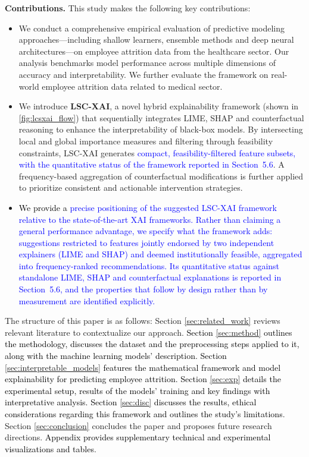 \documentclass[a4paper,fleqn]{cas-sc}
\begin{document}
\par\noindent\textbf{Contributions.} This study makes the following key contributions:
\begin{itemize}
    \item [(I)] We conduct a comprehensive empirical evaluation of predictive modeling approaches—including shallow learners, ensemble methods and deep neural architectures—on employee attrition data from the healthcare sector. Our analysis benchmarks model performance across multiple dimensions of accuracy and interpretability. We further evaluate the framework on real-world employee attrition data related to medical sector.
    
    \item[(II)] We introduce \textbf{LSC-XAI}, a novel hybrid explainability framework (shown in \cref{fig:lcsxai_flow}) that sequentially integrates LIME, SHAP and counterfactual reasoning to enhance the interpretability of black-box models. By intersecting local and global importance measures and filtering through feasibility constraints, LSC-XAI generates \textcolor{blue}{compact, feasibility-filtered feature subsets, with the quantitative status of the framework reported in Section~5.6}. A frequency-based aggregation of counterfactual modifications is further applied to prioritize consistent and actionable intervention strategies.

    \item[(III)] \textcolor{black}{We provide a} \textcolor{blue}{precise positioning of the suggested LSC-XAI framework relative to the state-of-the-art XAI frameworks. Rather than claiming a general performance advantage, we specify what the framework adds: suggestions restricted to features jointly endorsed by two independent explainers (LIME and SHAP) and deemed institutionally feasible, aggregated into frequency-ranked recommendations. Its quantitative status against standalone LIME, SHAP and counterfactual explanations is reported in Section~5.6, and the properties that follow by design rather than by measurement are identified explicitly.}  
\end{itemize}

The structure of this paper is as follows: Section \ref{sec:related_work} reviews relevant literature to contextualize our approach. \textcolor{black}{Section \ref{sec:method} outlines the methodology, discusses the dataset and the preprocessing steps applied to it, along with the machine learning models' description. Section \ref{sec:interpretable_models} features the mathematical framework and model explainability for predicting employee attrition. Section \ref{sec:exp} details the experimental setup, results of the models' training and key findings with interpretative analysis. Section \ref{sec:disc} discusses the results, ethical considerations regarding this framework and outlines the study’s limitations}. Section \ref{sec:conclusion} concludes the paper and proposes future research directions. \textcolor{black}{Appendix provides supplementary technical and experimental visualizations and tables}.
\end{document}
